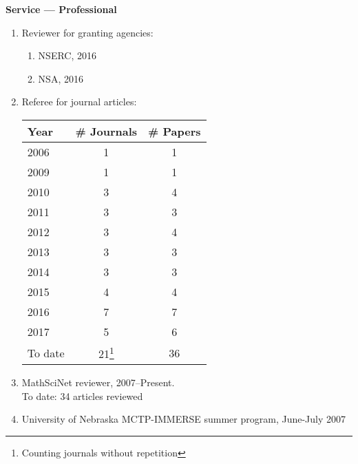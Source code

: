 \documentclass[12pt]{article}
\begin{document}
\textbf{Service --- Professional}
\begin{enumerate}

\item Reviewer for granting agencies:
\begin{enumerate}
\item NSERC, 2016
\item NSA, 2016
\end{enumerate}

\item Referee for journal articles: \\

\setcounter{footnote}{0}
\begin{center}
\begin{savenotes}
\begin{tabular}{lcc}
\toprule
Year & \# Journals & \# Papers \\
\midrule
2006 & 1 & 1 \\
2009 & 1 & 1 \\
2010 & 3 & 4 \\
2011 & 3 & 3 \\
2012 & 3 & 4 \\
2013 & 3 & 3 \\
2014 & 3 & 3 \\
2015 & 4 & 4 \\
2016 & 7 & 7 \\
2017 & 5 & 6 \\
\midrule
To date & 21\footnote{Counting journals without repetition} & 36 \\
\bottomrule
\end{tabular}
\end{savenotes}
\end{center}

\item MathSciNet reviewer, 2007--Present. \\
To date: 34 articles reviewed

\item University of Nebraska MCTP-IMMERSE summer program, June-July 2007

\end{enumerate}
\end{document}
